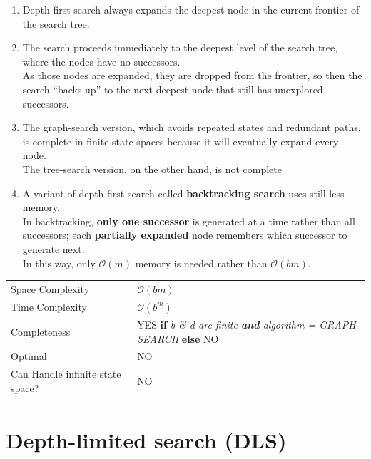 \begin{enumerate}
    \item Depth-first search always expands the deepest node in the current frontier of the search tree.

    \item The search proceeds immediately to the deepest level of the search tree, where the nodes have no successors.\\
    As those nodes are expanded, they are dropped from the frontier, so then the search “backs up” to the next deepest node that still has unexplored successors.

    \item The graph-search version, which avoids repeated states and redundant paths, is complete in finite state spaces because it will eventually expand every node.\\
    The tree-search version, on the other hand, is not complete

    \item A variant of depth-first search called \textbf{backtracking search} uses still less memory.\\
    In backtracking, \textbf{only one successor} is generated at a time rather than all successors; each \textbf{partially expanded} node remembers which successor to generate next.\\
    In this way, only $\mathcal{O}(m)$ memory is needed rather than $\mathcal{O}(bm)$.
\end{enumerate}


\begin{customTableWrapper}{1.2}
\begin{longtable}{p{3cm} p{6cm}}
    Space Complexity & $\mathcal{O}(bm)$ \\

    Time Complexity & $\mathcal{O}(b^m)$ \\

    \hline

    Completeness & YES \textbf{if} \textit{b \& d are finite \textbf{and} algorithm = GRAPH-SEARCH} \textbf{else} NO\\

    Optimal & NO \\

    Can Handle infinite state space? & NO \\
\end{longtable}
\end{customTableWrapper}


\section{Depth-limited search (DLS) \cite{aci-1}} \label{Depth-limited search (DLS)}


